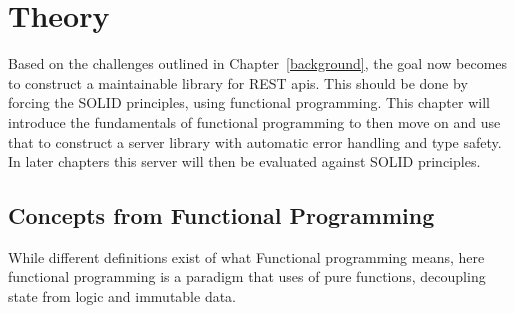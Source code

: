 \chapter{Theory}\label{theory} 

Based on the challenges outlined in Chapter~\ref{background}, the goal now
becomes to construct a maintainable library for REST apis. This should be done
by forcing the SOLID principles, using functional programming.  This chapter
will introduce the fundamentals of functional programming to then move on and
use that to construct a server library with automatic error handling and type
safety. In later chapters this server will then be evaluated against SOLID
principles.

\section{Concepts from Functional Programming}\label{functionalprogramming}

 While different definitions exist of what Functional programming means, here 
 functional programming is a paradigm that uses of pure functions,
 decoupling state from logic and immutable data.

